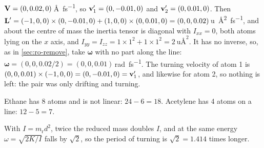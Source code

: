 $\bm{\mathrm{V}} = (0, 0.02, 0)$\,\si{\angstrom\per
\femto\second}, so $\bm{\mathrm{v}}_1' = (0, -0.01, 0)$ and $\bm{\mathrm{v}}_2' = (0, 0.01,
0)$. Then $\bm{\mathrm{L}}' = (-1, 0, 0)\times(0, -0.01, 0) + (1, 0, 0)\times(0,
0.01, 0) = (0, 0, 0.02)$\,\si{\amu\angstrom\squared\per\femto\second}, and
about the centre of mass the inertia tensor is diagonal with $I_{xx} = 0$,
both atoms lying on the $x$ axis, and $I_{yy} = I_{zz} = 1\times1^2 +
1\times1^2 = \SI{2}{\amu\angstrom\squared}$. It has no inverse, so, as in
\cref{sec:ro-remove}, take $\boldsymbol{\omega}$ with no part along the
line: $\boldsymbol{\omega} = (0, 0, 0.02/2) = (0, 0,
0.01)$\,\si{\radian\per\femto\second}. The turning velocity of atom 1 is $(0, 0, 0.01)\times(-1,
0, 0) = (0, -0.01, 0) = \bm{\mathrm{v}}_1'$, and likewise for atom 2, so nothing is
left: the pair was only drifting and turning.

Ethane has 8 atoms and is not linear: $24 - 6 =
18$. Acetylene has 4 atoms on a line: $12 - 5 = 7$.

With $I = m_{\mathrm r}d^2$, twice the reduced
mass doubles $I$, and at the same energy $\omega = \sqrt{2K/I}$ falls by
$\sqrt2$, so the period of turning is $\sqrt2 = 1.414$ times longer.
